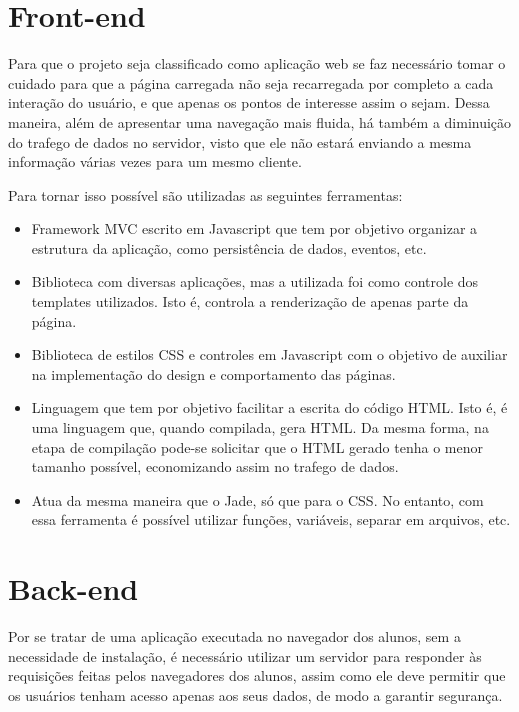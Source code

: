 \documentclass[graduacao,brazil]{ThesisPUC}
\begin{document}
\section{Front-end}

Para que o projeto seja classificado como aplicação web se faz necessário tomar o cuidado para que a página carregada não seja recarregada por completo a cada interação do usuário, e que apenas os pontos de interesse assim o sejam. Dessa maneira, além de apresentar uma navegação mais fluida, há também a diminuição do trafego de dados no servidor, visto que ele não estará enviando a mesma informação várias vezes para um mesmo cliente.

Para tornar isso possível são utilizadas as seguintes ferramentas:
\begin{itemize}
	\item \cite{Backbone} Framework MVC escrito em Javascript que tem por objetivo organizar a estrutura da aplicação, como persistência de dados, eventos, etc.
	\item \cite{Underscore} Biblioteca com diversas aplicações, mas a utilizada foi como controle dos templates utilizados. Isto é, controla a renderização de apenas parte da página.
	\item \cite{Bootstrap} Biblioteca de estilos CSS e controles em Javascript com o objetivo de auxiliar na implementação do design e comportamento das páginas.
	\item \cite{Jade} Linguagem que tem por objetivo facilitar a escrita do código HTML. Isto é, é uma linguagem que, quando compilada, gera HTML. Da mesma forma, na etapa de compilação pode-se solicitar que o HTML gerado tenha o menor tamanho possível, economizando assim no trafego de dados.
	\item \cite{Less} Atua da mesma maneira que o Jade, só que para o CSS. No entanto, com essa ferramenta é possível utilizar funções, variáveis, separar em arquivos, etc.
\end{itemize}

\section{Back-end}

Por se tratar de uma aplicação executada no navegador dos alunos, sem a necessidade de instalação, é necessário utilizar um servidor para responder às requisições feitas pelos navegadores dos alunos, assim como ele deve permitir que os usuários tenham acesso apenas aos seus dados, de modo a garantir segurança.
\end{document}
